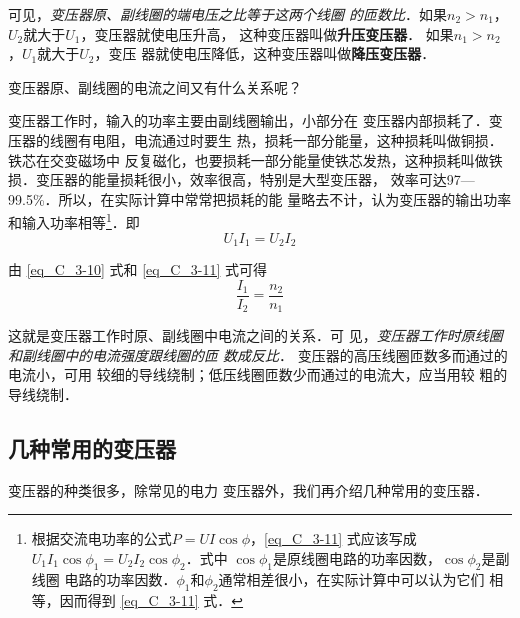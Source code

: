 可见，\textit{变压器原、副线圈的端电压之比等于这两个线圈
的匝数比}．如果$n_2>n_1$，$U_2$就大于$U_1$，变压器就使电压升高，
这种变压器叫做\textbf{升压变压器}．
如果$n_1>n_2$，$U_1$就大于$U_2$，变压
器就使电压降低，这种变压器叫做\textbf{降压变压器}．

变压器原、副线圈的电流之间又有什么关系呢？

变压器工作时，输入的功率主要由副线圈输出，小部分在
变压器内部损耗了．变压器的线圈有电阻，电流通过时要生
热，损耗一部分能量，这种损耗叫做铜损．铁芯在交变磁场中
反复磁化，也要损耗一部分能量使铁芯发热，这种损耗叫做铁
损．变压器的能量损耗很小，效率很高，特别是大型变压器，
效率可达97—99.5\%．所以，在实际计算中常常把损耗的能
量略去不计，认为变压器的输出功率和输入功率相等\footnote{根据交流电功率的公式$P=UI\cos\phi$，\eqref{eq_C_3-11} 式应该写成$U_1I_1\cos\phi_1
=U_2I_2\cos\phi_2$．式中 $\cos\phi_1$是原线圈电路的功率因数，$\cos\phi_2$是副线圈
电路的功率因数．$\phi_1$和$\phi_2$通常相差很小，在实际计算中可以认为它们
相等，因而得到 \eqref{eq_C_3-11} 式．}．即
\begin{equation}\label{eq_C_3-11}
    U_1I_1=U_2I_2
\end{equation}

由 \eqref{eq_C_3-10} 式和 \eqref{eq_C_3-11} 式可得
\begin{equation}\label{eq_C_3-12}
    \frac{I_1}{I_2}=\frac{n_2}{n_1}
\end{equation}

这就是变压器工作时原、副线圈中电流之间的关系．可
见，\textit{变压器工作时原线圈和副线圈中的电流强度跟线圈的匝
数成反比}．
变压器的高压线圈匝数多而通过的电流小，可用
较细的导线绕制；低压线圈匝数少而通过的电流大，应当用较
粗的导线绕制．

\subsection{几种常用的变压器}

变压器的种类很多，除常见的电力
变压器外，我们再介绍几种常用的变压器．

